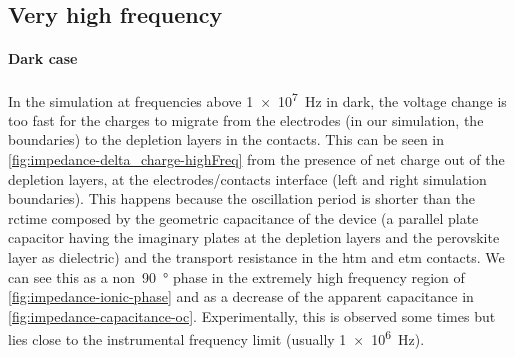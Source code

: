 	\begin{figure}%
	\end{figure}



	\subsection{Very high frequency}
	\paragraph{Dark case}
In the simulation at frequencies above \SI{1e7}{\Hz} in dark, the voltage change is too fast for the charges to migrate from the electrodes (in our simulation, the boundaries) to the depletion layers in the contacts.
This can be seen in \cref{fig:impedance-delta_charge-highFreq} from the presence of net charge out of the depletion layers, at the electrodes\-/contacts interface (left and right simulation boundaries).
This happens because the oscillation period is shorter than the \gls{rctime} composed by the geometric capacitance of the device (a parallel plate capacitor having the imaginary plates at the depletion layers and the perovskite layer as dielectric) and the transport resistance in the \gls{htm} and \gls{etm} contacts.
We can see this as a non~\SI{90}{\degree} phase in the extremely high frequency region of \cref{fig:impedance-ionic-phase} and as a decrease of the apparent capacitance in \cref{fig:impedance-capacitance-oc}.
Experimentally, this is observed some times but lies close to the instrumental frequency limit (usually \SI{1e6}{\Hz}).

